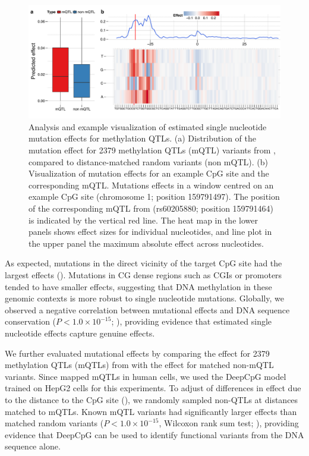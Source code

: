 \begin{figure}[htbp!]
\centering
\includegraphics[width=1.0\textwidth]{mut_qtl_zoom}
\caption[Analysis and example visualization of estimated single nucleotide mutation effects for methylation QTLs.]{Analysis and example visualization of estimated single nucleotide mutation effects for methylation QTLs. (a) Distribution of the mutation effect for 2379 methylation QTLs (mQTL) variants from \citet{kaplow_pooling-based_2015}, compared to distance-matched random variants (non mQTL). (b) Visualization of mutation effects for an example CpG site and the corresponding mQTL. Mutations effects in a window centred on an example CpG  site (chromosome 1; position 159791497). The position of the corresponding mQTL from \citet{kaplow_pooling-based_2015} (rs60205880; position 159791464) is indicated by the vertical red line. The heat map in the lower panels shows effect sizes for individual nucleotides, and line plot in the upper panel the maximum absolute effect across nucleotides.}
\label{fig:dcpg_mut_qtl_zoom}
\end{figure}

As expected, mutations in the direct vicinity of the target CpG site had the largest effects (). Mutations in CG dense regions such as CGIs or promoters tended to have smaller effects, suggesting that DNA methylation in these genomic contexts is more robust to single nucleotide mutations. Globally, we observed a negative correlation between mutational effects and DNA sequence conservation ($P<1.0\times10^{-15}$; ), providing evidence that estimated single nucleotide effects capture genuine effects.

We further evaluated mutational effects by comparing the effect for 2379 methylation QTLs (mQTLs) from \citet{kaplow_pooling-based_2015} with the effect for matched non-mQTL variants. Since \citet{kaplow_pooling-based_2015} mapped mQTLs in human cells, we used the DeepCpG model trained on HepG2 cells for this experiments. To adjust of differences in effect due to the distance to the CpG site (), we randomly sampled non-QTLs at distances matched to mQTLs. Known mQTL variants had significantly larger effects than matched random variants ($P<1.0\times10^{-15}$, Wilcoxon rank sum test; ), providing evidence that DeepCpG can be used to identify functional variants from the DNA sequence alone.

